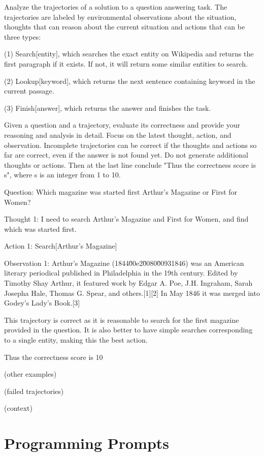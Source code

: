 \documentclass{article} \usepackage{iclr2024_conference,times}
\begin{document}
Analyze the trajectories of a solution to a question answering task. The trajectories are labeled by environmental observations about the situation, thoughts that can reason about the current situation and actions that can be three types: 

(1) Search[entity], which searches the exact entity on Wikipedia and returns the first paragraph if it exists. If not, it will return some similar entities to search.

(2) Lookup[keyword], which returns the next sentence containing keyword in the current passage.

(3) Finish[answer], which returns the answer and finishes the task.

Given a question and a trajectory, evaluate its correctness and provide your reasoning and analysis in detail. Focus on the latest thought, action, and observation. Incomplete trajectories can be correct if the thoughts and actions so far are correct, even if the answer is not found yet. Do not generate additional thoughts or actions. Then at the last line conclude "Thus the correctness score is {s}", where s is an integer from 1 to 10.

Question: Which magazine was started first Arthur's Magazine or First for Women?

Thought 1: I need to search Arthur's Magazine and First for Women, and find which was started first.

Action 1: Search[Arthur's Magazine]

Observation 1: Arthur's Magazine (1844\u00e2\u0080\u00931846) was an American literary periodical published in Philadelphia in the 19th century. Edited by Timothy Shay Arthur, it featured work by Edgar A. Poe, J.H. Ingraham, Sarah Josepha Hale, Thomas G. Spear, and others.[1][2] In May 1846 it was merged into Godey's Lady's Book.[3]

This trajectory is correct as it is reasonable to search for the first magazine provided in the question. It is also better to have simple searches corresponding to a single entity, making this the best action.

Thus the correctness score is 10

(other examples)

(failed trajectories)

(context)

\section{Programming Prompts}
\label{sec:programming_prompt}
\end{document}
